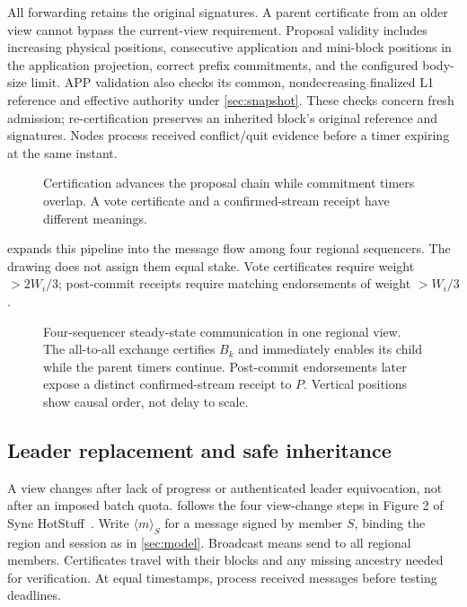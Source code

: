 \documentclass[11pt,a4paper,onecolumn]{article}
\begin{document}
All forwarding retains the original signatures. A parent certificate from an
older view cannot bypass the current-view requirement. Proposal validity
includes increasing physical positions, consecutive application and
mini-block positions in the application projection, correct prefix commitments,
and the configured body-size limit. APP validation also checks its common,
nondecreasing finalized L1 reference and effective authority under
\cref{sec:snapshot}. These checks concern fresh admission; re-certification
preserves an inherited block's original reference and signatures.
Nodes process received conflict/quit
evidence before a timer expiring at the same instant.

\begin{figure}[H]\centering

\caption{Certification advances the proposal chain while commitment timers
overlap. A vote certificate and a confirmed-stream receipt have different meanings.}
\label{fig:pipeline}
\end{figure}

 expands this pipeline into the message flow
among four regional sequencers. The drawing does not assign them equal stake.
Vote certificates require weight $>2W_i/3$; post-commit receipts require
matching endorsements of weight $>W_i/3$.

\begin{figure}[H]\centering

\caption{Four-sequencer steady-state communication in one regional view.
The all-to-all exchange certifies $B_k$ and immediately enables its child while
the parent timers continue. Post-commit endorsements later expose a distinct
confirmed-stream receipt to $P$. Vertical positions show causal order, not
delay to scale.}
\label{fig:pipeline-communication}
\end{figure}

\subsection{Leader replacement and safe inheritance}
A view changes after lack of progress or authenticated leader equivocation,
not after an imposed batch quota.  follows the four
view-change steps in Figure 2 of Sync HotStuff~\cite{synchotstuff}.
Write $\langle m\rangle_S$ for a message signed by member $S$, binding the
region and session as in \cref{sec:model}. Broadcast means send to
all regional members. Certificates travel with their blocks and any missing
ancestry needed for verification. At equal timestamps, process received
messages before testing deadlines.
\end{document}
